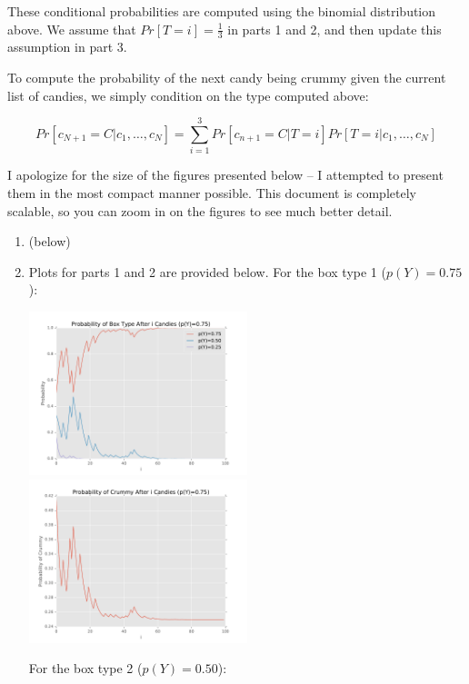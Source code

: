 \documentclass[fleqn]{homework}
\begin{document}
\begin{problem}{1}
    These conditional probabilities are computed using the binomial distribution
    above.  We assume that $Pr[T=i]=\frac{1}{3}$ in parts 1 and 2, and then
    update this assumption in part 3.

    To compute the probability of the next candy being crummy given the current
    list of candies, we simply condition on the type computed above:

    \begin{equation}
      Pr[c_{N+1} = C | c_1, \dots, c_N] = \sum_{i=1}^3 Pr[c_{n+1}=C|T=i] Pr[T=i|c_1, \dots, c_N]
    \end{equation}

    I apologize for the size of the figures presented below -- I attempted to
    present them in the most compact manner possible.  This document is
    completely scalable, so you can zoom in on the figures to see much better
    detail.

    \begin{enumerate}[1.] 
    \item (below) \item Plots for parts 1 and 2 are provided below.  For the box
      type 1 ($p(Y)=0.75$):

      \includegraphics[width=0.5\textwidth]{p1_part1_0_75.pdf}
      \includegraphics[width=0.5\textwidth]{p1_part2_0_75.pdf}

      For the box type 2 ($p(Y)=0.50$):


\end{enumerate}
\end{problem}
\end{document}
